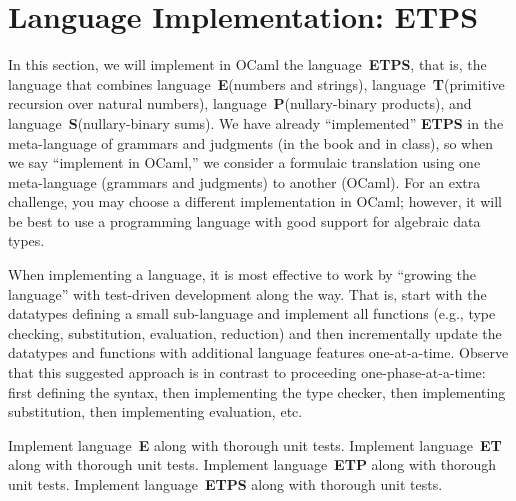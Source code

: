 \documentclass[12pt]{exam}
\newcommand{\fmtkw}[1]{\mathtt{#1}}
\newcommand{\expr}{\ensuremath{\mathit{e}}}
\newcommand{\addr}{\ensuremath{\mathit{a}}}
\newcommand{\plusc}[2]{\ensuremath{#1 \mathbin{\fmtkw{+}} #2}}
\newcommand{\setc}[2]{\ensuremath{#1 \mathrel{\fmtkw{:=}} #2}}
\newcommand{\whilec}[2]{\ensuremath{\fmtkw{while}\;#1\;\fmtkw{do}\;#2}}
\newcommand{\store}{\ensuremath{\sigma}}
\newcommand{\E}{\textbf{\textsf{E}}\xspace}
\newcommand{\T}{\textbf{\textsf{T}}\xspace}
\renewcommand{\P}{\textbf{\textsf{P}}\xspace}
\renewcommand{\S}{\textbf{\textsf{S}}\xspace}
\newcommand{\ET}{\textbf{\textsf{ET}}\xspace}
\newcommand{\ETP}{\textbf{\textsf{ETP}}\xspace}
\newcommand{\ETPS}{\textbf{\textsf{ETPS}}\xspace}
\newcommand{\state}[2]{\langle #1, #2 \rangle}
\newcommand{\eval}[2]{\ensuremath{#1 \Downarrow #2}}
\newcommand{\even}{\operatorname{even}}
\begin{document}
\begin{questions}
\end{questions}

\section{Language Implementation: \ETPS}

In this section, we will implement in OCaml the language~\ETPS, that is, the language that combines language~\E (numbers and strings), language~\T (primitive recursion over natural numbers), language~\P (nullary-binary products), and language~\S (nullary-binary sums). We have already ``implemented'' \ETPS in the meta-language of grammars and judgments (in the book and in class), so when we say ``implement in OCaml,'' we consider a formulaic translation using one meta-language (grammars and judgments) to another (OCaml). For an extra challenge, you may choose a different implementation in OCaml; however, it will be best to use a programming language with good support for algebraic data types.

When implementing a language, it is most effective to work by ``growing the language'' with test-driven development along the way. That is, start with the datatypes defining a small sub-language and implement all functions (e.g., type checking, substitution, evaluation, reduction) and then incrementally update the datatypes and functions with additional language features one-at-a-time. Observe that this suggested approach is in contrast to proceeding one-phase-at-a-time: first defining the syntax, then implementing the type checker, then implementing substitution, then implementing evaluation, etc.

\begin{questions}
  \question Implement language~\E along with thorough unit tests.
  \question Implement language~\ET along with thorough unit tests.
  \question Implement language~\ETP along with thorough unit tests.
  \question Implement language~\ETPS along with thorough unit tests.
\end{questions}
\end{document}
